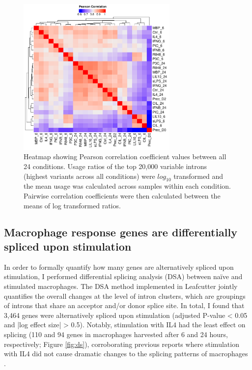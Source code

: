 \begin{figure}[H]
  \centering
  \includegraphics[width=0.7\textwidth]{cond_corr}
  \caption{Heatmap showing Pearson correlation coefficient values between all 24 conditions. Usage ratios of the top 20,000 variable introns (highest variants across all conditions) were $log_{10}$ transformed and the mean usage was calculated across samples within each condition. Pairwise correlation coefficients were then calculated between the means of log transformed ratios.}
  \label{fig:cond_corr}   
\end{figure}

\subsection{Macrophage response genes are differentially spliced upon stimulation}
In order to formally quantify how many genes are alternatively spliced upon stimulation, I performed differential splicing analysis (DSA) between naïve and stimulated macrophages. The DSA method implemented in Leafcutter jointly quantifies the overall changes at the level of intron clusters, which are groupings of introns that share an acceptor and/or donor splice site. In total, I found that 3,464 genes were alternatively spliced upon stimulation (adjusted P-value < 0.05 and |log effect size| > 0.5). Notably, stimulation with IL4 had the least effect on splicing (110 and 94 genes in macrophages harvested after 6 and 24 hours, respectively; Figure \ref{fig:ds}), corroborating previous reports where stimulation with IL4 did not cause dramatic changes to the splicing patterns of macrophages \cite{Liu2018-fh}. \\

